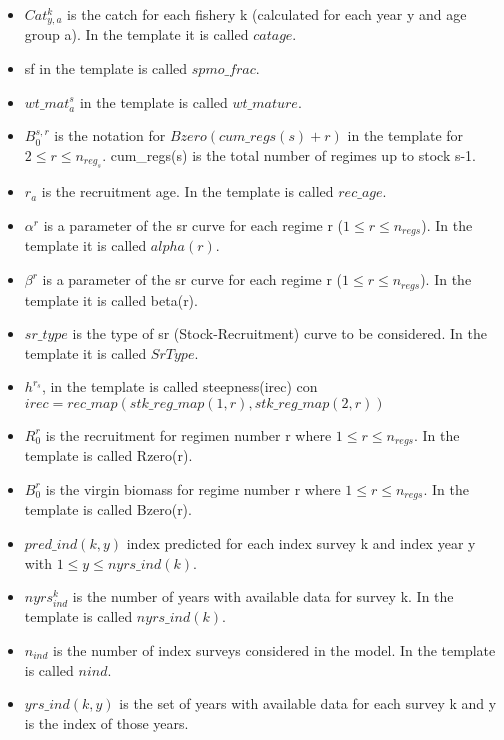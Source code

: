 \documentclass{article}
\begin{document}
\begin{itemize}
    \item $Cat^k_{y,a}$ is the catch for each fishery k (calculated for each year y and age group a). In the template it is called $catage$.
    \item sf in the template is called  $spmo\_frac$.
    \item ${wt\_{mat}}^s_a$ in the template is called 
    $wt\_mature$.
    \item $B^{s,r}_0$ is the notation for $Bzero(cum\_regs(s)+r)$ in the template  for $2\leq r \leq n_{reg_s}$. cum\_regs(s) is the total number of regimes up to stock s-1.
    \item $r_a$ is the recruitment age. In the template is called $rec\_age$.
    \item $\alpha^r$ is a parameter of the sr curve for each regime r ($1\leq r \leq n_{regs}$).  
 In the template it is called $alpha(r)$.
    \item $\beta^r$  is a parameter of the sr curve for each regime r ($1\leq r \leq n_{regs}$).  
 In the template it is called 
 beta(r). 
    \item $ sr\_type$ is the type of sr (Stock-Recruitment) curve to be considered. In the template it is called $SrType$.
    \item $h^{r_s}$, in the template is called steepness(irec) con $irec=rec\_map(stk\_reg\_map(1,r),stk\_reg\_map(2,r))$
    \item $R^{r}_0$ is the recruitment for regimen number r where $1\leq r \leq n_{regs}$. In the template is called Rzero(r).
    \item $B^{r}_0$ is the virgin biomass for regime number r where $1\leq r \leq n_{regs}$. In the template is called Bzero(r).
    \item $pred\_ind(k,y)$ index predicted for each index survey k and index year y with $1\leq y \leq nyrs\_ind(k)$.
    \item $nyrs_{ind}^k$ is the number of years with available data  for survey k. In the template is called $nyrs\_ind(k)$.
    \item $n_{ind}$ is the number of index surveys considered in the model. In the template is called $nind$.
    \item $yrs\_ind(k,y)$ is the set of years with available data for each survey k and y is the index of those years.

\end{itemize}
\end{document}
